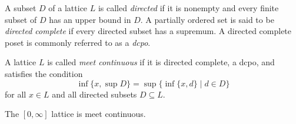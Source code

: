 \begin{comment}
\begin{definition}
  \emph{Quantales} are complete lattices equipped with an associative composition, typically denoted $\otimes$, that preserves suprema in both arguments.
\end{definition}


\begin{example}
  In this work, we consider only the standard metric quantale, whose underlying complete lattice is the interval $[0, \infty]$ ordered by $\geq$, with associative composition given by addition. Note that, since the order is reversed in this quantale, suprema in general lattices correspond to infima here, and vice versa.
\end{example}


\begin{lemma}[Way-below relation for the metric quantale] \cite{dahlqvist2023syntactic}
Let $L$ denote the complete lattice $[0, \infty]$ ordered by $\geq$.  
For all $x, y \in L$ and for every subset $X \subseteq L$, if $y > x$, then whenever $x \geq \inf X$, there exists a \emph{finite} subset $A \subseteq X$ such that $y \geq \inf A$.


This property characterizes the \emph{way-below relation} in the metric quantale. The lattice $L$ is \emph{continuous}, \ie for every $x \in L$,
	\begin{flalign*}
		x = \inf \{ y  \mid y \in L\ \text{and} \ y > x \}.
	\end{flalign*}
\end{lemma}
\end{comment}


\begin{definition}
  A subset $D$ of a lattice $L$ is called \emph{directed} if it is nonempty and every finite subset of $D$ has an upper bound in $D$. A partially ordered set is said to be \emph{directed complete} if every directed subset has a supremum. A directed complete poset is commonly referred to as a \emph{dcpo}.
\end{definition}

\begin{definition}
  A lattice $L$ is called \emph{meet continuous} if it is directed complete, \ie a dcpo, and satisfies the condition
  \[
    \inf\{ x, \sup D \} = \sup \{ \inf \{x, d\} \mid d \in D\} 
  \]
  for all $x \in L$ and all directed subsets $D \subseteq L$.
\end{definition}

\begin{lemma} \label{lem:meet_continuos}
  The $[0, \infty]$ lattice is meet continuous.
\end{lemma}


